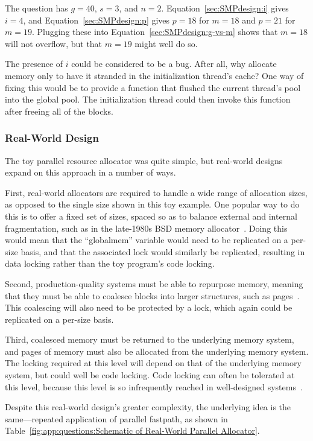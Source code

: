 {{	The question has $g=40$, $s=3$, and $n=2$.
	Equation~\ref{sec:SMPdesign:i} gives $i=4$, and
	Equation~\ref{sec:SMPdesign:p} gives $p=18$ for $m=18$
	and $p=21$ for $m=19$.
	Plugging these into Equation~\ref{sec:SMPdesign:g-vs-m}
	shows that $m=18$ will not overflow, but that $m=19$ might
	well do so.

	The presence of $i$ could be considered to be a bug.
	After all, why allocate memory only to have it stranded in
	the initialization thread's cache?
	One way of fixing this would be to provide a 
	function that flushed the current thread's pool into the
	global pool.
	The initialization thread could then invoke this function
	after freeing all of the blocks.
}\QuickQuizEndE
}

\subsubsection{Real-World Design}

The toy parallel resource allocator was quite simple, but real-world
designs expand on this approach in a number of ways.

First, real-world allocators are required to handle a wide range
of allocation sizes, as opposed to the single size shown in this
toy example.
One popular way to do this is to offer a fixed set of sizes, spaced
so as to balance external and internal fragmentation, such as in
the late-1980s BSD memory allocator~\cite{McKusick88}.
Doing this would mean that the ``globalmem'' variable would need
to be replicated on a per-size basis, and that the associated
lock would similarly be replicated, resulting in data locking
rather than the toy program's code locking.

Second, production-quality systems must be able to repurpose memory,
meaning that they must be able to coalesce blocks into larger structures,
such as pages~\cite{McKenney93}.
This coalescing will also need to be protected by a lock, which again
could be replicated on a per-size basis.

Third, coalesced memory must be returned to the underlying memory
system, and pages of memory must also be allocated from the underlying
memory system.
The locking required at this level will depend on that of the underlying
memory system, but could well be code locking.
Code locking can often be tolerated at this level, because this
level is so infrequently reached in well-designed systems~\cite{McKenney01e}.

Despite this real-world design's greater complexity, the underlying
idea is the same---repeated application of parallel fastpath,
as shown in
Table~\ref{fig:app:questions:Schematic of Real-World Parallel Allocator}.

